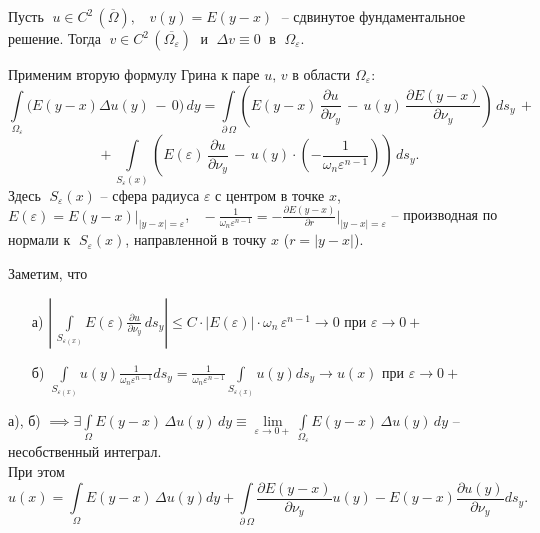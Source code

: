 \noindent Пусть $\; u \in C^2\, (\overline{\Omega}),\;$ $\; v(y) = E(y-x)\;$ -- сдвинутое фундаментальное решение. Тогда $\;v \in C^2\,(\overline{\Omega_\varepsilon})\;$ и $\; \Delta v \equiv 0\;$ в $\;\Omega_\varepsilon$.

\noindent Применим вторую формулу Грина к паре $u,\, v$ в области $\Omega_\varepsilon$:
$$
\int\limits_{\Omega_\varepsilon} \big(E(y-x) \Delta u(y)\, -\, 0\big)\,dy 
= \int\limits_{\partial\,\Omega} \left( E(y-x)\, \frac{\partial u}{\partial \nu_y}\, -\, u(y)\,\frac{\partial E(y-x)}{\partial \nu_y}\right)\,ds_y\, + $$
$$
+\,
\int\limits_{S_\varepsilon(x)} \left( E(\varepsilon)\, \frac{\partial u}{\partial \nu_y}\, - \, u(y) \cdot \left(- \frac{1}{\omega_n \varepsilon^{n-1}}\right)  \right)\, ds_y.
$$
\noindent Здесь $\;S_\varepsilon(x)$ -- сфера радиуса $\varepsilon$ с центром в точке $x$, $\displaystyle E(\varepsilon) = E(y-x)\big|_{|y-x| = \varepsilon}$, $\;\; \displaystyle -\frac{1}{\omega_n \varepsilon^{n-1}} = -\frac{\partial E(y-x)}{\partial r}\bigg|_{|y-x| = \varepsilon}$ -- производная по нормали к $\;S_\varepsilon(x)$, направленной в точку $x$ \; ($r = |y-x|$).
\newline

\noindent Заметим, что

\begin{enumerate}
    \item [а)] $\displaystyle \left | \, \int\limits_{S_{\varepsilon(x)}} E(\varepsilon) \frac{\partial u}{\partial \nu_y} \, ds_y \right | \leq C \cdot | E(\varepsilon) | \cdot \omega_n \, \varepsilon^{n-1} \rightarrow 0$ при $\varepsilon \rightarrow 0+$ 
    \item [б)] $\displaystyle \int\limits_{S_{\varepsilon(x)}} u(y)  \frac{1}{\omega_n  \varepsilon^{n-1}} ds_y = \frac{1}{\omega_n  \varepsilon^{n-1}} \int\limits_{S_{\varepsilon(x)}} u(y)  ds_y \to u(x)$ при $\varepsilon \to 0+$
\end{enumerate}

\vspace{2mm}\noindent а), б) $\implies \exists \displaystyle \int\limits_{\Omega} E(y-x) \, \Delta u(y) \, dy \equiv \lim\limits_{\varepsilon \to 0+} \int\limits_{\Omega_\varepsilon} E(y-x) \, \Delta u(y) \, dy$ -- несобственный интеграл. \\
\noindent При этом
\begin{equation}
\label{eq11.*}
    u(x) = \int\limits_{\Omega} E(y-x) \, \Delta u(y)  dy + \int\limits_{\partial \, \Omega} \frac{\partial E(y-x)}{\partial \nu_y}  u(y) - E(y-x)  \frac{\partial u(y)}{\partial \nu_y} ds_y. 
\end{equation}

